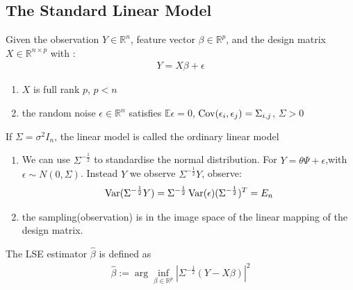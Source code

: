 \subsection{The Standard Linear Model}
\begin{definition}\label{model: linear}
Given the observation $Y \in \mathbb{R}^n$, feature vector $\beta \in \mathbb{R}^p$, and the design matrix $X \in \mathbb{R}^{n \times p}$  with  :
\begin{align*}
	Y = X \beta + \epsilon 
\end{align*}
\begin{enumerate}
	\item $X$ is full rank $p$, $p < n$
	\item the random noise $\epsilon \in \mathbb{R}^n$ satisfies  $\mathbb{E}\epsilon = 0$, $ \operatorname{Cov}(\epsilon_i, \epsilon_j) = \Sigma_{i, j}$, $\Sigma > 0$
\end{enumerate}
If $\Sigma = \sigma^2 I_n$, the linear model is called the ordinary linear model
\end{definition}
\begin{remark}\quad
\begin{enumerate}
	\item We can use $\Sigma^{-\frac{1}{2} }$ to standardise the normal distribution. For $Y = \theta \Psi + \epsilon$,with $\epsilon \sim N(0, \Sigma)$. Instead $Y$ we observe $\Sigma^{-\frac{1}{2}} Y$, observe:
	\begin{align*}
		\operatorname{Var}(\Sigma^{-\frac{1}{2}}Y) = \Sigma^{-\frac{1}{2}}\operatorname{Var}(\epsilon)(\Sigma^{-\frac{1}{2}})^T = E_n
	\end{align*}
    \item the sampling(observation) is in the image space of the linear mapping of the design matrix.
\end{enumerate}
\end{remark}

\begin{method}
	The LSE estimator $\hat{\beta}$ is defined as
	\begin{align*}
		\hat{\beta}:= \arg\inf_{\beta \in \mathbb{R}^p}|\Sigma^{-\frac{1}{2}}(Y - X\beta)|^2
	\end{align*}
\end{method}



